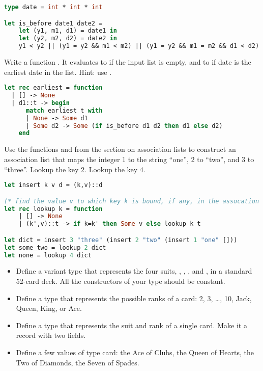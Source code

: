 \begin{lstlisting}[language=OCaml]
type date = int * int * int

let is_before date1 date2 =
	let (y1, m1, d1) = date1 in
	let (y2, m2, d2) = date2 in
	y1 < y2 || (y1 = y2 && m1 < m2) || (y1 = y2 && m1 = m2 && d1 < d2)
\end{lstlisting}

Write a function . It evaluates to  if the input list is empty, and to  if date  is the earliest date in the list. Hint: use .

\begin{lstlisting}[language=OCaml]
let rec earliest = function
  | [] -> None
  | d1::t -> begin
      match earliest t with
      | None -> Some d1
      | Some d2 -> Some (if is_before d1 d2 then d1 else d2)
    end
\end{lstlisting}

Use the functions  and  from the section on association lists to construct an association list that maps the integer 1 to the string ``one'', 2 to ``two'', and 3 to ``three''. Lookup the key 2. Lookup the key 4.

\begin{lstlisting}[language=OCaml]
let insert k v d = (k,v)::d

(* find the value v to which key k is bound, if any, in the assocation list *)
let rec lookup k = function
	| [] -> None
	| (k',v)::t -> if k=k' then Some v else lookup k t

let dict = insert 3 "three" (insert 2 "two" (insert 1 "one" []))
let some_two = lookup 2 dict
let none = lookup 4 dict
\end{lstlisting}

\problem[cards]
\begin{itemize}
  \item Define a variant type  that represents the four suits, , , , and , in a standard 52-card deck. All the constructors of your type should be constant.
  \item Define a type  that represents the possible ranks of a card: 2, 3, \ldots, 10, Jack, Queen, King, or Ace.
  \item Define a type  that represents the suit and rank of a single card. Make it a record with two fields.
  \item Define a few values of type card: the Ace of Clubs, the Queen of Hearts, the Two of Diamonds, the Seven of Spades.
\end{itemize}

